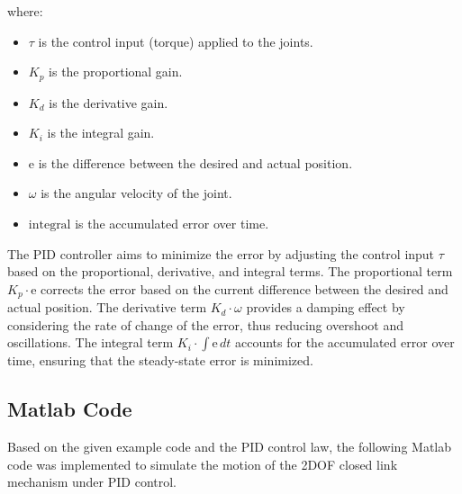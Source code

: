 \documentclass{article}
\begin{document}
where:
\begin{itemize}
  \item \(\tau\) is the control input (torque) applied to the joints.
  \item \(K_p\) is the proportional gain.
  \item \(K_d\) is the derivative gain.
  \item \(K_i\) is the integral gain.
  \item \(\text{e}\) is the difference between the desired and actual position.
  \item \(\omega\) is the angular velocity of the joint.
  \item \(\text{integral}\) is the accumulated error over time.
\end{itemize}
The PID controller aims to minimize the error by adjusting the control input \(\tau\) based on the proportional, derivative, and integral terms. The proportional term \(K_p \cdot \text{e}\) corrects the error based on the current difference between the desired and actual position. The derivative term \(K_d \cdot \omega\) provides a damping effect by considering the rate of change of the error, thus reducing overshoot and oscillations. The integral term \(K_i \cdot \int \text{e} \, dt\) accounts for the accumulated error over time, ensuring that the steady-state error is minimized.

\newpage

\subsection*{Matlab Code}
Based on the given example code and the PID control law, the following Matlab code was implemented to simulate the motion of the 2DOF closed link mechanism under PID control.
\end{document}
